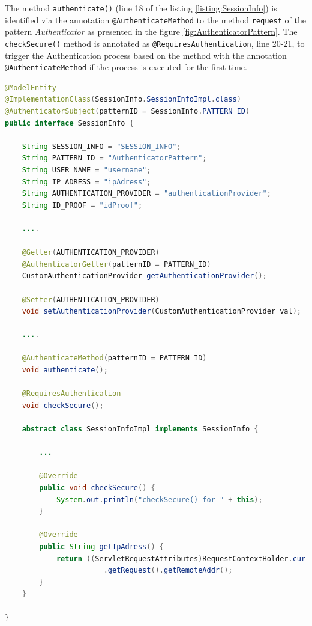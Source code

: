 The method \texttt{authenticate()} (line 18 of the listing \ref{listing:SessionInfo}) is identified via the annotation \texttt{@AuthenticateMethod} to the method \texttt{request} of the pattern \textit{Authenticator} as presented in the figure \ref{fig:AuthenticatorPattern}.
The \texttt{checkSecure()} method is annotated as \texttt{@RequiresAuthentication}, line 20-21,  to trigger the Authentication process based on the method with the annotation \texttt{@AuthenticateMethod} if the process is executed for the first time. 

\begin{lstlisting}[language=Java,basicstyle=\ttfamily\footnotesize, caption= \texttt{SessionInfo} to implement the \textit{Subject} entity,label=listing:SessionInfo]
@ModelEntity
@ImplementationClass(SessionInfo.SessionInfoImpl.class)
@AuthenticatorSubject(patternID = SessionInfo.PATTERN_ID)
public interface SessionInfo {

	String SESSION_INFO = "SESSION_INFO";
	String PATTERN_ID = "AuthenticatorPattern";
	String USER_NAME = "username";
	String IP_ADRESS = "ipAdress";
	String AUTHENTICATION_PROVIDER = "authenticationProvider";
	String ID_PROOF = "idProof";

    ....
    
	@Getter(AUTHENTICATION_PROVIDER)
	@AuthenticatorGetter(patternID = PATTERN_ID)
	CustomAuthenticationProvider getAuthenticationProvider();

	@Setter(AUTHENTICATION_PROVIDER)
	void setAuthenticationProvider(CustomAuthenticationProvider val);

    ....
    
	@AuthenticateMethod(patternID = PATTERN_ID)
	void authenticate();

	@RequiresAuthentication
	void checkSecure();

	abstract class SessionInfoImpl implements SessionInfo {

        ...
        
		@Override
		public void checkSecure() {
			System.out.println("checkSecure() for " + this);
		}

		@Override
		public String getIpAdress() {
			return ((ServletRequestAttributes)RequestContextHolder.currentRequestAttributes())
			           .getRequest().getRemoteAddr();
		}
	}

}
\end{lstlisting}

